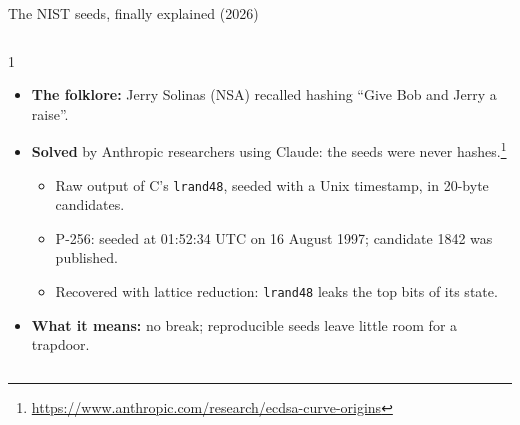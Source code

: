 \ifdefined\PRESENTATION\else\PassOptionsToClass{handout}{beamer}\fi\documentclass[aspectratio=169, lualatex]{beamer}
\begin{document}
\begin{frame}{The NIST seeds, finally explained (2026)}
	\begin{columns}[c]
		\begin{column}{1\textwidth}
			\begin{itemize}
				\item \textbf{The folklore:} Jerry Solinas (NSA) recalled hashing ``Give Bob and Jerry a raise''.
				\item \textbf{Solved} by Anthropic researchers using Claude: the seeds were never hashes.\footnote{\url{https://www.anthropic.com/research/ecdsa-curve-origins}}
				      \begin{itemize}
					      \item Raw output of C's \texttt{lrand48}, seeded with a Unix timestamp, in 20-byte candidates.
					      \item P-256: seeded at 01:52:34 UTC on 16 August 1997; candidate 1842 was published.
					      \item Recovered with lattice reduction: \texttt{lrand48} leaks the top bits of its state.
				      \end{itemize}
				\item \textbf{What it means:} no break; reproducible seeds leave little room for a trapdoor.
			\end{itemize}
		\end{column}
	\end{columns}
\end{frame}
\end{document}
